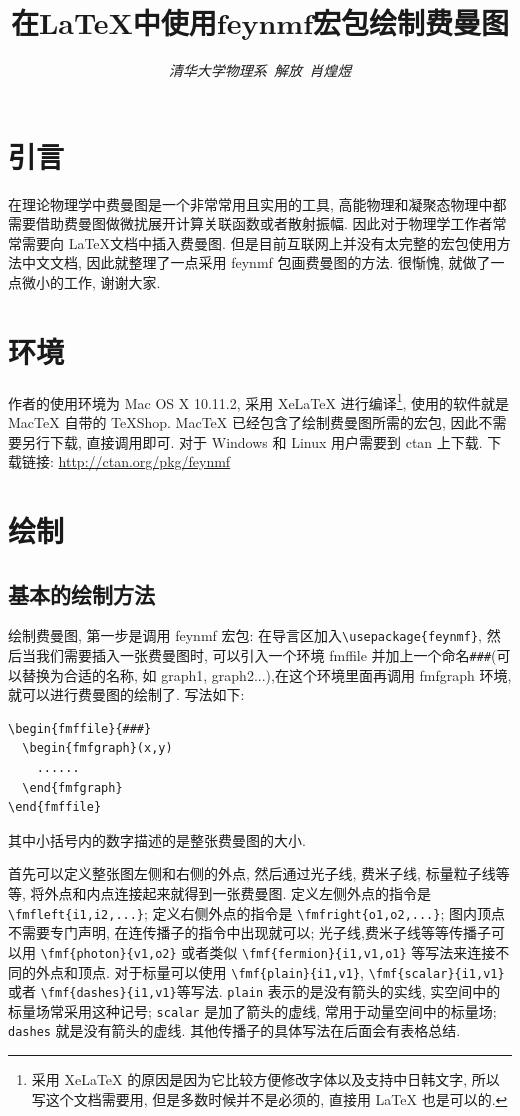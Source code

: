 \documentclass{article}
\title{\bf{在\LaTeX 中使用$\mathbf{feynmf}$宏包绘制费曼图}}
\author{\emph{清华大学物理系\, 解放\, 肖煌煜}}
\date{}
\begin{document}
\maketitle
\section{引言}
在理论物理学中费曼图是一个非常常用且实用的工具, 高能物理和凝聚态物理中都需要借助费曼图做微扰展开计算关联函数或者散射振幅. 因此对于物理学工作者常常需要向 \LaTeX 文档中插入费曼图. 但是目前互联网上并没有太完整的宏包使用方法中文文档, 因此就整理了一点采用 feynmf 包画费曼图的方法. 很惭愧, 就做了一点微小的工作, 谢谢大家.

\section{环境}
作者的使用环境为 Mac OS X 10.11.2, 采用 XeLaTeX 进行编译\footnote{采用 XeLaTeX 的原因是因为它比较方便修改字体以及支持中日韩文字, 所以写这个文档需要用, 但是多数时候并不是必须的, 直接用 LaTeX 也是可以的.}, 使用的软件就是 MacTeX 自带的 TeXShop. MacTeX 已经包含了绘制费曼图所需的宏包, 因此不需要另行下载, 直接调用即可. 对于 Windows 和 Linux 用户需要到 ctan 上下载. 下载链接: \url{http://ctan.org/pkg/feynmf}

\section{绘制}
\subsection{基本的绘制方法}
绘制费曼图, 第一步是调用 feynmf 宏包: 在导言区加入\verb+\usepackage{feynmf}+, 然后当我们需要插入一张费曼图时, 可以引入一个环境 fmffile 并加上一个命名\verb+###+(可以替换为合适的名称, 如 graph1, graph2...),在这个环境里面再调用 fmfgraph 环境, 就可以进行费曼图的绘制了. 写法如下:
\begin{verbatim}
\begin{fmffile}{###}
  \begin{fmfgraph}(x,y)
    ......
  \end{fmfgraph}
\end{fmffile}
\end{verbatim}
其中小括号内的数字描述的是整张费曼图的大小.

首先可以定义整张图左侧和右侧的外点, 然后通过光子线, 费米子线, 标量粒子线等等, 将外点和内点连接起来就得到一张费曼图. 定义左侧外点的指令是 \verb+\fmfleft{i1,i2,...}+; 定义右侧外点的指令是 \verb+\fmfright{o1,o2,...}+; 图内顶点不需要专门声明, 在连传播子的指令中出现就可以; 光子线,费米子线等等传播子可以用 \verb+\fmf{photon}{v1,o2}+ 或者类似 \verb+\fmf{fermion}{i1,v1,o1}+ 等写法来连接不同的外点和顶点. 对于标量可以使用 \verb+\fmf{plain}{i1,v1}+, \verb+\fmf{scalar}{i1,v1}+ 或者 \verb+\fmf{dashes}{i1,v1}+等写法. \verb+plain+ 表示的是没有箭头的实线, 实空间中的标量场常采用这种记号; \verb+scalar+ 是加了箭头的虚线, 常用于动量空间中的标量场; \verb+dashes+ 就是没有箭头的虚线. 其他传播子的具体写法在后面会有表格总结. 
\end{document}

